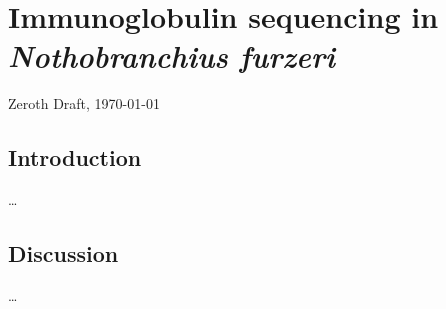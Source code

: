
\chapter{Immunoglobulin sequencing in \textit{Nothobranchius furzeri}} 
\label{chap:igseq} 
\onehalfspacing

\ifdefineChapter
	{\LARGE Zeroth Draft, \today}
\fi

\pagebreak

\section{Introduction}
\label{sec:igseq_intro}

\dots














\section{Discussion}
\label{sec:igseq_discussion}

\dots